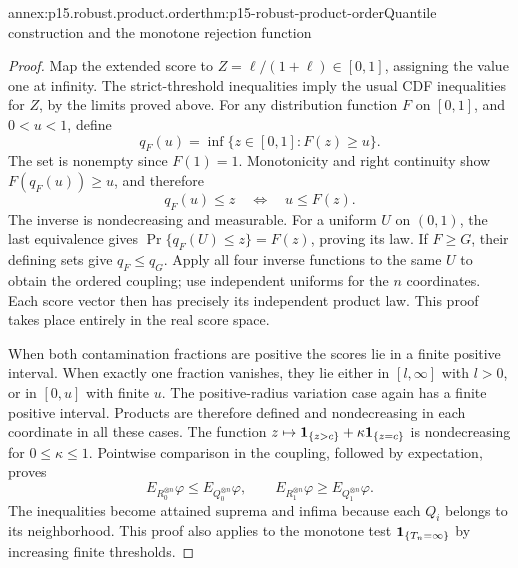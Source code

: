 \begin{annexitem}{annex:p15.robust.product.order}{thm:p15-robust-product-order}{Quantile construction and the monotone rejection function}
\begin{proof}
Map the extended score to \(Z=\ell/(1+\ell)\in[0,1]\), assigning
the value one at infinity. The strict-threshold inequalities imply
the usual CDF inequalities for \(Z\), by the limits proved above.
For any distribution function \(F\) on \([0,1]\), and \(0<u<1\), define
\[
 q_F(u)=\inf\{z\in[0,1]:F(z)\geq u\}.
\]
The set is nonempty since \(F(1)=1\). Monotonicity and right
continuity show \(F(q_F(u))\geq u\), and therefore
\[
 q_F(u)\leq z\quad\Longleftrightarrow\quad u\leq F(z).
\]
The inverse is nondecreasing and measurable. For a uniform \(U\) on
\((0,1)\), the last equivalence gives
\(\Pr\{q_F(U)\leq z\}=F(z)\), proving its law.
If \(F\geq G\), their defining sets give \(q_F\leq q_G\).
Apply all four inverse functions to the same \(U\) to obtain the
ordered coupling; use independent uniforms for the \(n\) coordinates.
Each score vector then has precisely its independent product law.
This proof takes place entirely in the real score space.

When both contamination fractions are positive the scores lie in a
finite positive interval. When exactly one fraction vanishes, they
lie either in \([l,\infty]\) with \(l>0\), or in \([0,u]\) with
finite \(u\). The positive-radius variation case again has a finite
positive interval. Products are therefore defined and nondecreasing
in each coordinate in all these cases.
The function
\(z\mapsto{\bf1}_{\{z>c\}}+\kappa{\bf1}_{\{z=c\}}\) is nondecreasing
for \(0\leq\kappa\leq1\).
Pointwise comparison in the coupling, followed by expectation,
proves
\[
 E_{R_0^{\otimes n}}\varphi\leq E_{Q_0^{\otimes n}}\varphi,\qquad
 E_{R_1^{\otimes n}}\varphi\geq E_{Q_1^{\otimes n}}\varphi .
\]
The inequalities become attained suprema and infima because each
\(Q_i\) belongs to its neighborhood.
This proof also applies to the monotone test \({\bf1}_{\{T_n=\infty\}}\)
by increasing finite thresholds.
\end{proof}
\end{annexitem}

